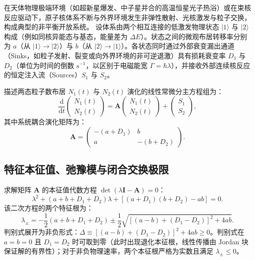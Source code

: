 在天体物理极端环境（如超新星爆发、中子星并合的高温恒星光子热浴）或在束核反应驱动下，原子核体系不断与外界环境发生非弹性散射、光核激发与粒子交换，构成典型的非平衡开放系统。
设体系由两个相互连接的低激发物理状态 $|1\rangle$ 与 $|2\rangle$ 构成（例如同核异能态与基态，能量差为 $\Delta E$）。状态之间的微观布居转移率分别为 $a$（从 $|1\rangle \to |2\rangle$）与 $b$（从 $|2\rangle \to |1\rangle$）。各状态同时通过外部衰变漏出通道（Sinks，如粒子发射、裂变或向外界环境的非可逆退激）具有损耗衰变率 $D_1$ 与 $D_2$（单位为时间的倒数 $\mathrm{s}^{-1}$，以区别于电磁能宽 $\Gamma = \hbar \lambda$），并接收外部连续核反应的恒定注入流（Sources）$S_1$ 与 $S_2$。

描述两态粒子数布居 $N_1(t)$ 与 $N_2(t)$ 演化的线性常微分主方程组为：
\begin{equation}\label{eq:appD-master-eq-2state}
\frac{\mathrm{d}}{\mathrm{d}t} \begin{pmatrix} N_1(t) \\ N_2(t) \end{pmatrix} = \mathbf{A} \begin{pmatrix} N_1(t) \\ N_2(t) \end{pmatrix} + \begin{pmatrix} S_1 \\ S_2 \end{pmatrix},
\end{equation}
其中系统耦合演化矩阵为：
\begin{equation}\label{eq:appD-coupling-matrix}
\mathbf{A} = \begin{pmatrix} -(a + D_1) & b \\ a & -(b + D_2) \end{pmatrix}.
\end{equation}

\subsection{特征本征值、弛豫模与闭合交换极限}

求解矩阵 $\mathbf{A}$ 的本征值代数方程 $\det(\lambda \mathbf{I} - \mathbf{A}) = 0$：
\begin{equation}\label{eq:appD-char-eq}
\lambda^2 + (a + b + D_1 + D_2) \lambda + \left[ (a + D_1)(b + D_2) - a b \right] = 0.
\end{equation}
该二次方程的两个特征根为：
\begin{equation}\label{eq:appD-eigenvalues-2state}
\lambda_\pm = -\frac{1}{2}(a + b + D_1 + D_2) \pm \frac{1}{2} \sqrt{[(a - b) + (D_1 - D_2)]^2 + 4 a b}.
\end{equation}
判别式展开为非负形式：$\Delta \equiv [(a - b) + (D_1 - D_2)]^2 + 4 a b \ge 0$。判别式在 $a=b=0$ 且 $D_1 = D_2$ 时可取到零（此时出现退化本征根，线性传播由 Jordan 块保证解的有界性）；对于非负物理速率，两个本征根严格为实数且满足 $\lambda_\pm \le 0$。

